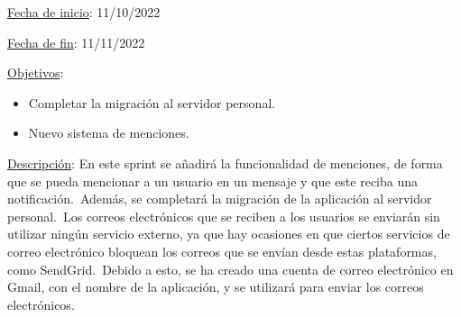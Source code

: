 
\underline{Fecha de inicio}: 11/10/2022

\underline{Fecha de fin}: 11/11/2022

\underline{Objetivos}:
\begin{itemize}
	\item Completar la migración al servidor personal.
	\item Nuevo sistema de menciones.
\end{itemize}

\underline{Descripción}:
En este sprint se añadirá la funcionalidad de menciones, de forma que se pueda mencionar a un usuario en un
mensaje y que este reciba una notificación.\ Además, se completará la migración de la aplicación al servidor
personal.\ Los correos electrónicos que se reciben a los usuarios se enviarán sin utilizar ningún servicio externo,
ya que hay ocasiones en que ciertos servicios de correo electrónico bloquean los correos que se envían desde
estas plataformas, como SendGrid.\ Debido a esto, se ha creado una cuenta de correo electrónico en Gmail, con el nombre
de la aplicación, y se utilizará para enviar los correos electrónicos.


